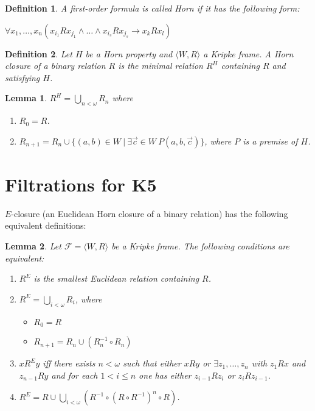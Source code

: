 \documentclass[a4paper]{article}
\theoremstyle{defin}
\newtheorem{defin}{Definition}
\theoremstyle{theorem}
\theoremstyle{prop}
\theoremstyle{lemma}
\newtheorem{lemma}{Lemma}
\theoremstyle{fact}
\theoremstyle{ex}
\theoremstyle{col}
\theoremstyle{claim}
\begin{document}
\begin{defin} A first-order formula is called Horn if it has the following form:

  \begin{center}
    $\forall x_1, \dots, x_n (x_{i_1} R x_{j_1} \land \dots \land x_{i_s} R x_{j_s} \rightarrow x_k R x_l)$
  \end{center}
\end{defin}

\begin{defin}
  Let $H$ be a Horn property and $\langle W, R \rangle$ a Kripke frame. A Horn closure of a binary relation $R$ is the minimal relation $R^{H}$ containing $R$ and satisfying $H$.
\end{defin}

\begin{lemma}
  $R^{H} = \bigcup \limits_{n < \omega} R_n$ where

  \begin{enumerate}
    \item $R_0 = R$.
    \item $R_{n + 1} = R_n \cup \{ (a, b) \in W \: | \: \exists \vec{c} \in W \: P(a, b, \vec{c})\}$, where $P$ is a premise of $H$.
  \end{enumerate}
\end{lemma}

\section{Filtrations for {\bf K5}}

$E$-closure (an Euclidean Horn closure of a binary relation) has the following equivalent definitions:
\begin{lemma} \label{equivHorn}
  Let $\mathcal{F} = \langle W, R \rangle$ be a Kripke frame.
  The following conditions are equivalent:

  \begin{enumerate}
    \item $R^{E}$ is the smallest Euclidean relation containing $R$.
    \item $R^{E} = \bigcup \limits_{i < \omega} R_i$, where
    \begin{itemize}
      \item $R_0 = R$
      \item $R_{n + 1} = R_n \cup (R^{-1}_n \circ R_n)$
    \end{itemize}
    \item $x R^E y$ iff there exists $n < \omega$ such that
    either $x R y$ or $\exists z_1, \dots, z_n$ with $z_1 R x$ and $z_{n - 1} R y$ and for each $1 < i \leq n$ one has
    either $z_{i - 1} R z_i$ or $z_i R z_{i - 1}$.
    \item $R^{E} = R \cup \bigcup \limits_{i < \omega} (R^{-1} \circ (R \circ R^{-1})^n \circ R)$.
  \end{enumerate}
\end{lemma}
\end{document}
